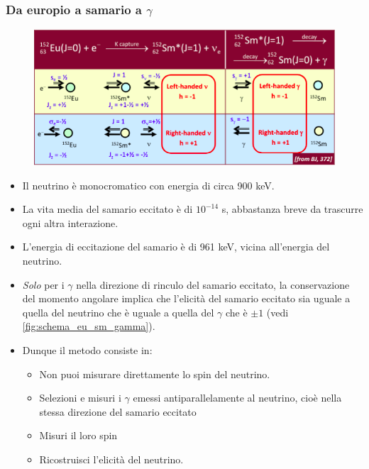 \subsubsection{Da europio a samario a $\gamma$}
\begin{figure}[H]
    \centering
    \includegraphics[width=\textwidth]{immagini/fig_schema_eu_sm_gamma.png}
    \caption{}
    \label{fig:schema_eu_sm_gamma}
\end{figure}
\begin{itemize}
    \item Il neutrino è monocromatico con energia di circa 900 keV.
    \item La vita media del samario eccitato è di $10^{-14}$ s, abbastanza breve da trascurre ogni altra interazione.
    \item L'energia di eccitazione del samario è di 961 keV, vicina all'energia del neutrino.
    \item \textit{Solo} per i $\gamma$ nella direzione di rinculo del samario eccitato, la conservazione del momento angolare implica che l'elicità del samario eccitato sia uguale a quella del neutrino che è uguale a quella del $\gamma$ che è $\pm1$ (vedi \autoref{fig:schema_eu_sm_gamma}).
    \item Dunque il metodo consiste in:
    \begin{itemize}
        \item Non puoi misurare direttamente lo spin del neutrino.
        \item Selezioni e misuri i $\gamma$ emessi antiparallelamente al neutrino, cioè nella stessa direzione del samario eccitato
        \item Misuri il loro spin
        \item Ricostruisci l'elicità del neutrino.
    \end{itemize}
\end{itemize}
